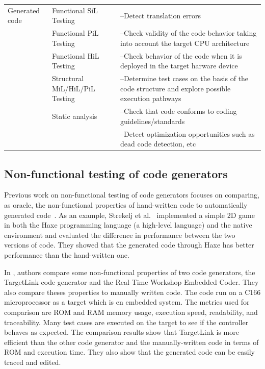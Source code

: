 \begin{table}[H]
\begin{tabular}{| p{} | p{} |p{} |}
			Generated code 
			& Functional SiL Testing & --Detect translation errors \\
			\cline{2-3}
			& Functional PiL Testing & --Check validity of the code behavior taking into account the target CPU architecture \\
			\cline{2-3}
			& Functional HiL Testing & --Check behavior of the code when it is deployed in the target harware device \\
			\cline{2-3}
			& Structural MiL/HiL/PiL Testing & --Determine test cases on the basis of the code structure and explore possible execution pathways \\
			\cline{2-3}
			& Static analysis & --Check that code conforms to coding guidelines/standards\\
			&& --Detect optimization opportunities such as dead code detection, etc \\
			\hline
		\end{tabular}
		\label{tab:targetlink}
	\end{table}
 


\subsection{Non-functional testing of code generators}
\label{sec:Non-functional testing of code generators}
Previous work on non-functional testing of code generators focuses on comparing, as oracle, the non-functional properties of hand-written code to automatically generated code~\cite{stepasyuk2015evaluating,richard2013efficient}. As an example, Strekelj et al.~\cite{vstrekelj2015performance} implemented a simple 2D game in both the Haxe programming language (a high-level language) and the native environment and evaluated the difference in performance between the two versions of code. They showed that the generated code through Haxe has better performance than the hand-written one. 

In \cite{ajwad2007evaluation}, authors compare some non-functional properties of two code generators, the TargetLink code generator and the Real-Time Workshop Embedded Coder. They also compare theses properties to manually written code. The code run on a C166 microprocessor as a target which is en embedded system.
The metrics used for comparison are ROM and RAM memory usage, execution speed, readability, and traceability. Many test cases are executed on the target to see if the controller behaves as expected.
The comparison results show that TargetLink is more efficient than the other code generator and the manually-written code in terms of ROM and execution time. They also show that the generated code can be easily traced and edited.

